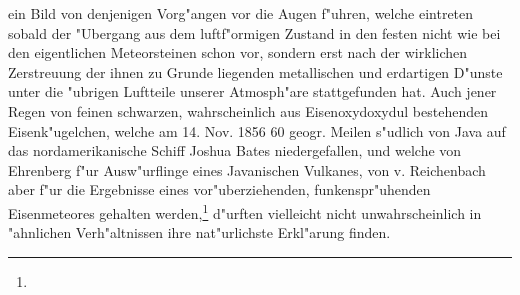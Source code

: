 \documentclass[a4paper, 8pt, oneside, polutonikogreek, german]{article}
\begin{document}
ein Bild von denjenigen Vorg"angen vor die Augen f"uhren, welche eintreten sobald der "Ubergang aus dem luftf"ormigen Zustand in den festen nicht wie bei den eigentlichen Meteorsteinen schon vor, sondern erst nach der wirklichen Zerstreuung der ihnen zu Grunde liegenden metallischen und erdartigen D"unste unter die "ubrigen Luftteile unserer Atmosph"are stattgefunden hat. Auch jener Regen von feinen schwarzen, wahrscheinlich aus Eisenoxydoxydul bestehenden Eisenk"ugelchen, welche am 14. Nov. 1856 60 geogr. Meilen s"udlich von Java auf das nordamerikanische Schiff Joshua Bates niedergefallen, und welche von Ehrenberg f"ur Ausw"urflinge eines Javanischen Vulkanes, von v. Reichenbach aber f"ur die Ergebnisse eines vor"uberziehenden, funkenspr"uhenden Eisenmeteores gehalten werden,\footnote{} d"urften vielleicht nicht unwahrscheinlich in "ahnlichen Verh"altnissen ihre nat"urlichste Erkl"arung finden.
\end{document}
